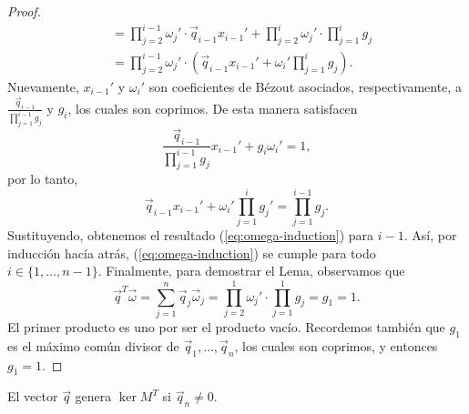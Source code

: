 \begin{proof}
\begin{align*}
		&= \prod_{j=2}^{i-1}\omega_j' \cdot \vec{q}_{i-1}x_{i-1}' + \prod_{j=2}^{i}\omega_j' \cdot
		\prod_{j=1}^{i}g_j \\
		&= \prod_{j=2}^{i-1}\omega_j' \cdot \left( \vec{q}_{i-1}x_{i-1}' + \omega_i'
			\prod_{j=1}^{i}g_j \right).
	\end{align*}
	Nuevamente, $x_{i-1}'$ y $\omega_i'$ son coeficientes de Bézout asociados, respectivamente, a
	$\frac{\vec{q}_{i-1}}{\prod_{j=1}^{i-1}g_j}$ y $g_i$, los cuales son coprimos. De esta manera
	satisfacen
	\begin{equation*}
		\frac{\vec{q}_{i-1}}{\prod_{j=1}^{i-1}g_j}x_{i-1}' +
		g_i \omega_i' = 1,
	\end{equation*}
	por lo tanto,
	\begin{equation*}
		\vec{q}_{i-1}x_{i-1}' + \omega_i'\prod_{j=1}^{i}g_j' = \prod_{j=1}^{i-1}g_j.
	\end{equation*}
	Sustituyendo, obtenemos el resultado (\ref{eq:omega-induction}) para $i - 1$. Así, por inducción
	hacía atrás, (\ref{eq:omega-induction}) se cumple para todo $i \in \lbrace 1, \ldots, n - 1
	\rbrace$. Finalmente, para demostrar el Lema, observamos que
	\begin{equation*}
		\vec{q}^T\vec{\omega} = \sum_{j=1}^{n}\vec{q}_j\vec{\omega}_j = \prod_{j=2}^{1}\omega_j'
		\cdot \prod_{j=1}^{1}g_j = g_1 = 1.
	\end{equation*}
	El primer producto es uno por ser el producto vacío. Recordemos también que $g_1$ es el máximo
	común divisor de $\vec{q}_1, \ldots, \vec{q}_n$, los cuales son coprimos, y entonces $g_1 = 1$.
\end{proof}
\begin{corollary}
	\label{lemma:iso2}
	El vector $\vec{q}$ genera $\ker{M^T}$ si $\vec{q}_n \neq 0$.
\end{corollary}

